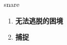 
\begin{frame}
{\huge snare}
\begin{center}
\begin{enumerate}\Large
  \item \textbf{无法逃脱的困境}
  \item \textbf{捕捉}
\end{enumerate}
\end{center}
\end{frame}
